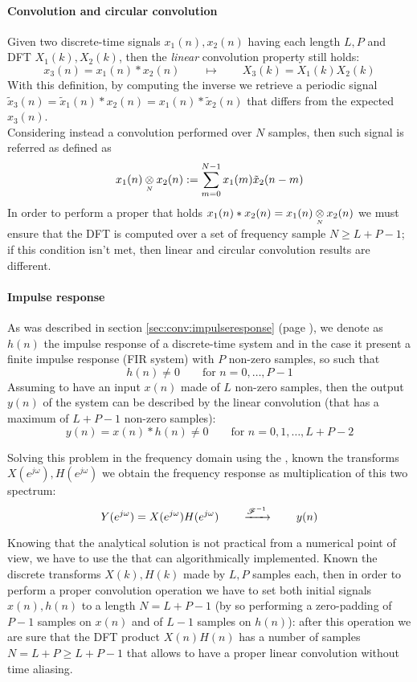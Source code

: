 		\paragraph{Convolution and circular convolution} Given two discrete-time signals $x_1(n),x_2(n)$ having each length $L,P$ and DFT $X_1(k),X_2(k)$, then the \textit{linear} convolution property still holds:
		\begin{equation}
			x_3(n) = x_1(n) * x_2(n) \qquad \mapsto \qquad X_3(k) = X_1(k) X_2(k)
		\end{equation}
		With this definition, by computing the inverse \dft we retrieve a periodic signal $ \tilde x_3(n) = \tilde x_1(n) * x_2(n) = x_1(n) * \tilde x_2(n)$ that differs from the expected $x_3(n)$.\\
		Considering instead a convolution performed over $N$ samples, then such signal is referred as  defined as
		\begin{equation}
			x_1(n) \underset{\text{\tiny $N$}} \otimes x_2(n) := \sum_{m=0}^{N-1} x_1(m) \tilde x_2(n-m)
		\end{equation}
		In order to perform a proper \dft that holds $x_1(n)*x_2(n) = x_1(n) \underset{\text{\tiny $N$}} \otimes x_2(n)$ we must ensure that the DFT is computed over a set of frequency sample $N \geq L+ P - 1$; if this condition isn't met, then linear and circular convolution results are different.
		
		\paragraph{Impulse response} As was described in section \ref{sec:conv:impulseresponse} (page \pageref{sec:conv:impulseresponse}), we denote as $h(n)$ the impulse response of a discrete-time system and in the case it present a finite impulse response (FIR system) with $P$ non-zero samples, so such that
		\[ h(n) \neq 0 \qquad \textrm{for } n = 0,\dots, P-1 \]
		Assuming to have an input $x(n)$ made of $L$ non-zero samples, then the output $y(n)$ of the system can be described by the linear convolution (that has a maximum of $L+P-1$ non-zero samples):
		\[ y(n) = x(n) * h(n) \neq 0 \qquad \textrm{for } n=0,1,\dots, L+P-2 \]
		
		Solving this problem in the frequency domain using the \dtft, known the transforms $X(e^{j\omega}), H(e^{j\omega})$  we obtain the frequency response as multiplication of this two spectrum:
		\[ Y(e^{j\omega}) = X(e^{j\omega}) H(e^{j\omega}) \qquad \xrightarrow{\mathscr F^{-1}} \qquad y(n) \]
		
		Knowing that the analytical solution is not practical from a numerical point of view, we have to use the \dft that can algorithmically implemented. Known the discrete transforms $X(k),H(k)$ made by $L,P$ samples each, then in order to perform a proper convolution operation we have to set both initial signals $x(n),h(n)$ to a length $N=L+P-1$ (by so performing a zero-padding of $P-1$ samples on $x(n)$ and of $L-1$ samples on $h(n)$): after this operation we are sure that the DFT product $X(n)H(n)$ has a number of samples $N = L+P \geq L+P-1$ that allows to have a proper linear convolution without time aliasing.		
		
